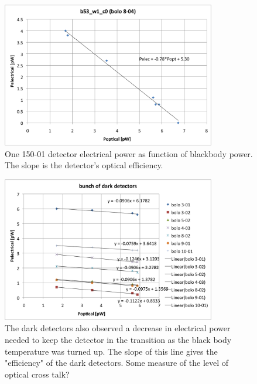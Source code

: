 \begin{figure}[ht!]
\begin{center}
\includegraphics[height=2.5in]{figures/Nb01_PelecvsPopt_b53_w1_c0}
\caption{One 150-01 detector electrical power as function of blackbody power. The slope is the detector's optical efficiency. 
\label{fig:pelec_vs_popt} }
\end{center}
\end{figure}


\begin{figure}[ht!]
\begin{center}
\includegraphics[height=2.5in]{figures/darkdetectoreffs}
\caption{The dark detectors also observed a decrease in electrical power needed to keep the detector in the transition as the black body temperature was turned up. The slope of this line gives the "efficiency" of the dark detectors. Some measure of the level of optical cross talk?
\label{fig:dark_optical_efficiencies} }
\end{center}
\end{figure}




